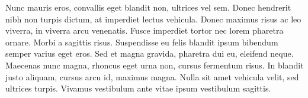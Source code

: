\label{ap:modelo-de-capa}

Nunc mauris eros, convallis eget blandit non, ultrices vel sem. Donec hendrerit nibh non turpis dictum, at imperdiet lectus vehicula. Donec maximus risus ac leo viverra, in viverra arcu venenatis. Fusce imperdiet tortor nec lorem pharetra ornare. Morbi a sagittis risus. Suspendisse eu felis blandit ipsum bibendum semper varius eget eros. Sed et magna gravida, pharetra dui eu, eleifend neque. Maecenas nunc magna, rhoncus eget urna non, cursus fermentum risus. In blandit justo aliquam, cursus arcu id, maximus magna. Nulla sit amet vehicula velit, sed ultrices turpis. Vivamus vestibulum ante vitae ipsum vestibulum sagittis.
